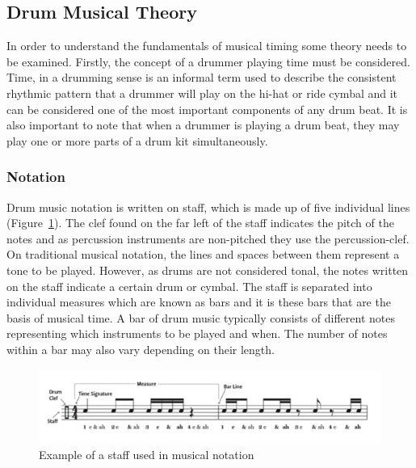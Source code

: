 \documentclass[a4paper, 11pt]{article}
\begin{document}
\subsection{Drum Musical Theory}
In order to understand the fundamentals of musical timing some theory needs to be examined. Firstly, the concept of a drummer playing time must be considered. Time, in a drumming sense is an informal term used to describe the consistent rhythmic pattern that a drummer will play on the hi-hat or ride cymbal \cite{drum-bible} and it can be considered one of the most important components of any drum beat. It is also important to note that when a drummer is playing a drum beat, they may play one or more parts of a drum kit simultaneously.  

\subsubsection{Notation}
Drum music notation is written on staff, which is made up of five individual lines (Figure~\ref{fig: staff}). The clef found on the far left of the staff indicates the pitch of the notes \cite{oxford-comp} and as percussion instruments are non-pitched they use the percussion-clef. On traditional musical notation, the lines and spaces between them represent a tone to be played. However, as drums are not considered tonal, the notes written on the staff indicate a certain drum or cymbal. The staff is separated into individual measures which are known as bars \cite{drum-note} and it is these bars that are the basis of musical time. A bar of drum music typically consists of different notes representing which instruments to be played and when. The number of notes within a bar may also vary depending on their length. 

\begin{figure}[h]
	\centering
	\includegraphics[scale=0.3]{images/staff.jpg}
	\caption{Example of a staff used in musical notation}
	\label{fig: staff}
\end{figure}
\end{document}
